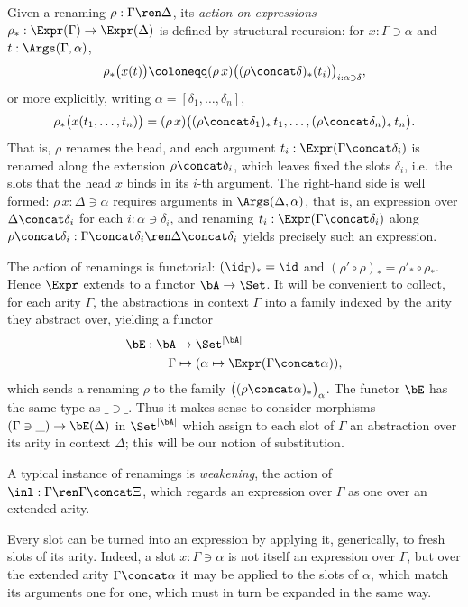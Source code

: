 Given a renaming $\rho : \Gamma \ren \Delta$, its \emph{action on expressions} $\rho_* : \Expr(\Gamma) \to \Expr(\Delta)$ is defined by structural recursion: for $x : \Gamma \ni \alpha$ and $t : \Args(\Gamma, \alpha)$,
\[
\rho_*\big(x(t)\big) \coloneqq (\rho\, x)\big((\rho \concat \delta)_*(t_i)\big)_{i : \alpha \ni \delta},
\]
or more explicitly, writing $\alpha = [\delta_1, \ldots, \delta_n]$,
\[
\rho_*\big(x(t_1, \ldots, t_n)\big) = (\rho\, x)\big((\rho \concat \delta_1)_*\, t_1, \ldots, (\rho \concat \delta_n)_*\, t_n\big).
\]
That is, $\rho$ renames the head, and each argument $t_i : \Expr(\Gamma \concat \delta_i)$ is renamed along the extension $\rho \concat \delta_i$, which leaves fixed the slots $\delta_i$, i.e.\ the slots that the head $x$ binds in its $i$-th argument.
The right-hand side is well formed: $\rho\, x : \Delta \ni \alpha$ requires arguments in $\Args(\Delta, \alpha)$, that is, an expression over $\Delta \concat \delta_i$ for each $i : \alpha \ni \delta_i$, and renaming $t_i : \Expr(\Gamma \concat \delta_i)$ along $\rho \concat \delta_i : \Gamma \concat \delta_i \ren \Delta \concat \delta_i$ yields precisely such an expression.

The action of renamings is functorial: $(\id_\Gamma)_* = \id$ and $(\rho' \circ \rho)_* = \rho'_* \circ \rho_*$. Hence $\Expr$ extends to a functor $\bA \to \Set$. It will be convenient to collect, for each arity $\Gamma$, the abstractions in context $\Gamma$ into a family indexed by the arity they abstract over, yielding a functor
\begin{align*}
    \bE : \bA &\to \Set^{\left| \bA \right|}\\
    \Gamma &\mapsto (\alpha \mapsto \Expr(\Gamma \concat \alpha)),
\end{align*}
which sends a renaming $\rho$ to the family $\big((\rho \concat \alpha)_*\big)_{\alpha}$.
The functor $\bE$ has the same type as $\_ \ni \_$. Thus it makes sense to consider morphisms $(\Gamma \ni \_) \to \bE(\Delta)$ in $\Set^{\left|\bA\right|}$ which assign to each slot of $\Gamma$ an abstraction over its arity in context $\Delta$; this will be our notion of substitution.

A typical instance of renamings is \emph{weakening}, the action of $\inl : \Gamma \ren \Gamma \concat \Xi$, which regards an expression over $\Gamma$ as one over an extended arity.

Every slot can be turned into an expression by applying it, generically, to fresh slots of its arity. Indeed, a slot $x : \Gamma \ni \alpha$ is not itself an expression over $\Gamma$, but over the extended arity $\Gamma \concat \alpha$ it may be applied to the slots of $\alpha$, which match its arguments one for one, which must in turn be expanded in the same way.


